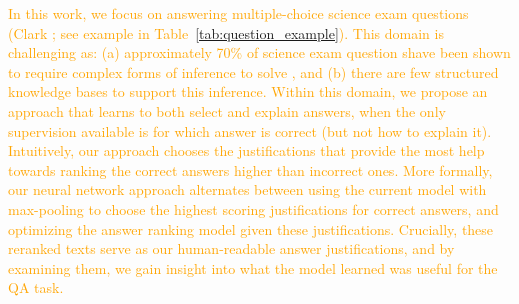 \textcolor{orange}{In this work, we focus on answering multiple-choice science exam questions (Clark \citeyear{clark:2015}; see example in Table~\ref{tab:question_example}). 
This domain is challenging as: (a) approximately 70\% of science exam question shave been shown to require complex forms of inference to solve \cite{clark:2013,jansen-EtAl:2016:COLING}, and (b) there are few structured knowledge bases to support this inference.  
Within this domain, we propose an approach that learns to both select and explain answers, when the only supervision available is for which answer is correct (but not how to explain it).
Intuitively, our approach chooses the justifications that provide the most help towards ranking the correct answers higher than incorrect ones.
More formally, our neural network approach alternates between using the current model with max-pooling to choose the highest scoring justifications for correct answers, and optimizing the answer ranking model given these justifications. 
Crucially, these reranked texts serve as our human-readable answer justifications, and by examining them, we gain insight into what the model learned was useful for the QA task.  }





\address{Applied to science MCQA }

\address{Description (clark and jansen stuff)}

\address{Lure answers}

